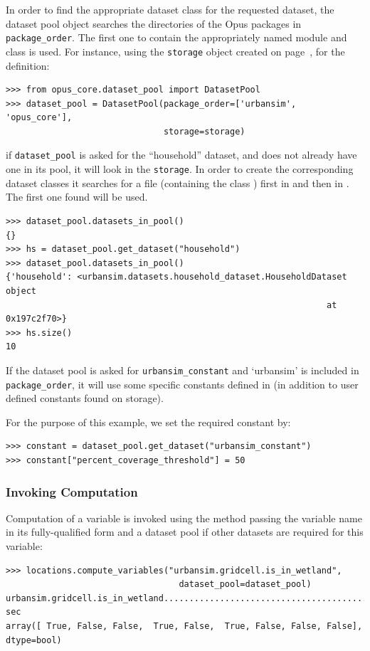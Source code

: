 In order to find the appropriate dataset class for the requested dataset, the dataset
pool object searches the  directories of the Opus packages in
\verb|package_order|.  The first one to contain the appropriately named module
and class is used.  For instance, using the \verb|storage| object created on page~\pageref{storagepage},
for the definition:
\begin{verbatim}
>>> from opus_core.dataset_pool import DatasetPool
>>> dataset_pool = DatasetPool(package_order=['urbansim', 'opus_core'],
                               storage=storage)
\end{verbatim}
if \verb|dataset_pool| is asked for the ``household'' dataset, and does not
already have one in its pool, it will look in the \verb|storage|. In order to
create the corresponding dataset classes
it searches for a file
 (containing the class ) first in  and then in
. The first one found will be used.
\begin{verbatim}
>>> dataset_pool.datasets_in_pool()
{}
>>> hs = dataset_pool.get_dataset("household")
>>> dataset_pool.datasets_in_pool()
{'household': <urbansim.datasets.household_dataset.HouseholdDataset object
                                                               at 0x197c2f70>}
>>> hs.size()
10
\end{verbatim}
If the dataset pool is asked for \verb|urbansim_constant| and `urbansim' is included in \verb|package_order|,
it will use some  specific constants defined in  (in addition to
user defined constants found on storage).

For the purpose of this example, we set the required constant by:
\begin{verbatim}
>>> constant = dataset_pool.get_dataset("urbansim_constant")
>>> constant["percent_coverage_threshold"] = 50
\end{verbatim}

\subsubsection{Invoking Computation}
\label{sec:compute-variables}
Computation of a variable is invoked using the  method
 passing the variable name in its fully-qualified
form and a dataset pool if other datasets are required for this variable:
 \label{page:compute-isnearcbd}
\variablesindex
\begin{verbatim}
>>> locations.compute_variables("urbansim.gridcell.is_in_wetland",
                                  dataset_pool=dataset_pool)
urbansim.gridcell.is_in_wetland..........................................0.0 sec
array([ True, False, False,  True, False,  True, False, False, False], dtype=bool)
\end{verbatim}

